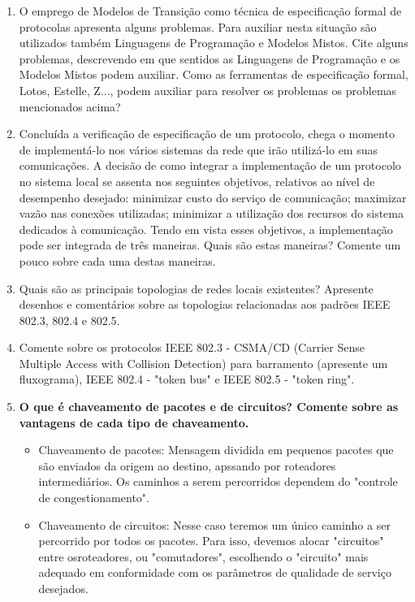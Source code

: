 \documentclass[10pt]{article}
\begin{document}
\begin{enumerate}
\begin{enumerate}
\begin{figure}[h!]
            \label{fig:mef1}
        \end{figure}
    \end{enumerate}
    \item O emprego de Modelos de Transição como técnica de especificação formal de
    protocolas apresenta alguns problemas. Para auxiliar nesta situação são utilizados
    também Linguagens de Programação e Modelos Mistos. Cite alguns problemas, 
    descrevendo em que sentidos as Linguagens de Programação e os Modelos Mistos podem
    auxiliar. Como as ferramentas de especificação formal, Lotos, Estelle, Z..., podem
    auxiliar para resolver os problemas os problemas mencionados acima?

    \item Concluída a verificação de especificação de um protocolo, chega o momento
    de implementá-lo nos vários sistemas da rede que irão utilizá-lo em suas 
    comunicações. A decisão de como integrar a implementação de um protocolo no 
    sistema local se assenta nos seguintes objetivos, relativos ao nível de desempenho
    desejado: minimizar custo do serviço de comunicação; maximizar vazão nas conexões
    utilizadas; minimizar a utilização dos recursos do sistema dedicados à comunicação.
    Tendo em vista esses objetivos, a implementação pode ser integrada de três 
    maneiras. Quais são estas maneiras? Comente um pouco sobre cada uma destas
    maneiras.

    \item Quais são as principais topologias de redes locais existentes? Apresente
    desenhos e comentários sobre as topologias relacionadas aos padrões IEEE 802.3,
    802.4 e 802.5.

    \item Comente sobre os protocolos IEEE 802.3 - CSMA/CD (Carrier Sense Multiple
    Access with Collision Detection) para barramento (apresente um fluxograma),
    IEEE 802.4 - "token bus" e IEEE 802.5 - "token ring".

    \item \textbf{O que é chaveamento de pacotes e de circuitos? Comente sobre as 
    vantagens de cada tipo de chaveamento.}
    \begin{itemize}
        \item Chaveamento de pacotes: Mensagem dividida em pequenos pacotes
        que são enviados da origem ao destino, apssando por roteadores intermediários.
        Os caminhos a serem percorridos dependem do "controle de congestionamento".
        \item Chaveamento de circuitos: Nesse caso teremos um único caminho a ser
        percorrido por todos os pacotes. Para isso, devemos alocar "circuitos" entre
        osroteadores, ou "comutadores", escolhendo o "circuito" mais adequado em
        conformidade com os parâmetros de qualidade de serviço desejados.
    \end{itemize}


\end{enumerate}
\end{document}
